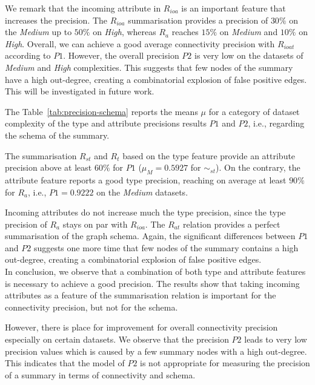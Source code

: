 We remark that the incoming attribute in $R_{ioa}$ is an important feature that increases the precision. The $R_{ioa}$ summarisation provides a precision of $30\%$ on the \emph{Medium} up to $50\%$ on \emph{High}, whereas $R_a$ reaches $15\%$ on \emph{Medium} and $10\%$ on \emph{High}. Overall, we can achieve a good average connectivity precision with $R_{ioat}$ according to $P1$. However, the overall precision $P2$ is very low on the datasets of \emph{Medium} and \emph{High} complexities. This suggests that few nodes of the summary have a high out-degree, creating a combinatorial explosion of false positive edges. This will be investigated in future work.




The Table~\ref{tab:precision-schema} reports the means $\mu$ for a category of dataset complexity of the type and attribute precisions results $P1$ and $P2$, i.e., regarding the schema of the summary.

The summarisation $R_{st}$ and $R_t$ based on the type feature provide an attribute precision above at least $60\%$ for $P1$ ($\mu_M=0.5927$ for $\sim_{st}$).
On the contrary, the attribute feature reports a good type precision, reaching on average at least $90\%$ for $R_a$, i.e., $P1=0.9222$ on the \emph{Medium} datasets.

Incoming attributes do not increase much the type precision, since the type precision of $R_a$ stays on par with $R_{ioa}$. The $R_{at}$ relation provides a perfect summarisation of the graph schema. Again, the significant differences between $P1$ and $P2$ suggests one more time that few nodes of the summary contains a high out-degree, creating a combinatorial explosion of false positive edges.\\



In conclusion, we observe that a combination of both type and attribute features is necessary to achieve a good precision. The results show that taking incoming attributes as a feature of the summarisation relation is important for the connectivity precision, but not for the schema.

However, there is place for improvement for overall connectivity precision especially on certain datasets. We observe that the precision $P2$ leads to very low precision values which is caused by a few summary nodes with a high out-degree. This indicates that the model of $P2$ is not appropriate for measuring the precision of a summary in terms of connectivity and schema.

